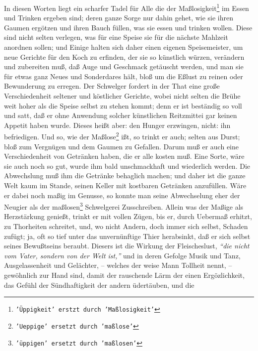 \medskip

In diesen Worten liegt ein scharfer Tadel für Alle die der Maßlosigkeit\footnote{\texttt{'Üppigkeit' erstzt durch 'Maßlosigkeit'}} im Essen
und Trinken ergeben sind; deren ganze Sorge nur dahin gehet, wie sie ihren
Gaumen ergötzen und ihren Bauch füllen, was sie essen und trinken wollen. Diese
sind nicht selten verlegen, was für eine Speise sie für die nächste Mahlzeit
anordnen sollen; und Einige halten sich daher einen eigenen Speisemeister, um
neue Gerichte für den Koch zu erfinden, der sie so künstlich würzen, verändern
und zubereiten muß, daß Auge und Geschmack getäuscht werden, und man sie für
etwas ganz Neues und Sonderdares hält, bloß um die Eßlust zu reinen oder
Bewunderung zu erregen. Der Schwelger fordert in der That eine große
Verschiedenheit seltener und köstlicher Gerichte, wobei nicht selten die Brühe
weit hoher als die Speise selbst zu stehen kommt; denn er ist beständig so voll
und satt, daß er ohne Anwendung solcher künstlichen Reitzmittei gar keinen
Appetit haben wurde. Dieses heißt aber: den Hunger erzwingen, nicht: ihn
befriedigen. Und so, wie der Maßlose\footnote{\texttt{'Ueppige' ersetzt durch 'maßlose'}} ißt, so trinkt er auch; selten aus Durst;
bloß zum Vergnügen und dem Gaumen zu Gefallen. Darum muß er auch eine
Verschiedenheit von Getränken haben, die er alle kosten muß. Eine Sorte, wäre
sie auch noch so gut, wurde ihm bald unschmackhaft und wiederlich werden. Die
Abwechslung muß ihm die Getränke behaglich machen; und daher ist die ganze Welt
kaum im Stande, seinen Keller mit kostbaren Getränken anzufüllen. Wäre er dabei
noch maßig im Genusse, so konnte man seine Abwechselung eher der Neugier als der
maßlosen\footnote{\texttt{'üppigen' ersetzt durch 'maßlosen'}} Schwelgerei Zusschreiben. Allein was der Maßige als Herzstärkung
genießt, trinkt er mit vollen Zügen, bis er, durch Uebermaß erhitzt, zu
Thorheiten schreitet, und, wo nicht Andern, doch immer sich selbst, Schaden
zufügt; ja, oft so tief unter das unvernünftige Thier herabsinkt, daß er sich
selbst seines Bewußtseins beraubt. Diesers ist die Wirkung der Fleischeslust,
\textit{"`die nicht vom Vater, sondern von der Welt ist,"'} und in deren Gefolge Musik und Tanz, Ausgelassenheit und Gelächter, -- welches der weise Mann Tollheit
nennt, -- gewöhnlich zur Hand sind, damit der rauschende Lärm der einen
Ergözlichkeit, das Gefühl der Sündhaftigkeit der andern üdertäuben, und die
